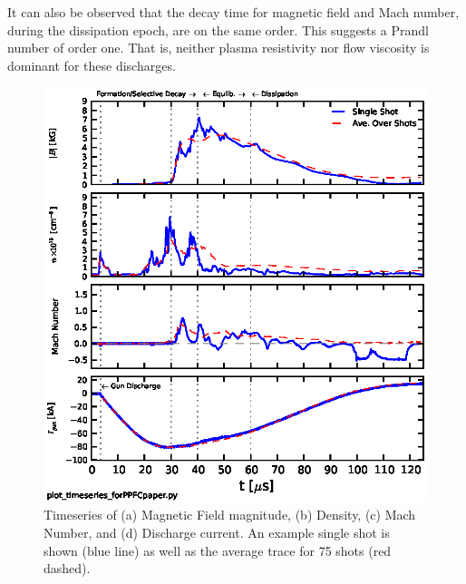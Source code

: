 \documentclass[12pt]{iopart}
\begin{document}
It can also be observed that the decay time for magnetic field and Mach number, during the dissipation epoch, are on the same order. This suggests a Prandl number of order one. That is, neither plasma resistivity nor flow viscosity is dominant for these discharges.

\begin{figure}[!htbp]
\centerline{
\includegraphics[width=16cm]{timeseries36.eps}}
\caption{\label{fig:timeseries36} Timeseries of (a) Magnetic Field magnitude, (b) Density, (c) Mach Number, and (d) Discharge current. An example single shot is shown (blue line) as well as the average trace for 75 shots (red dashed).}
\end{figure}
\end{document}
